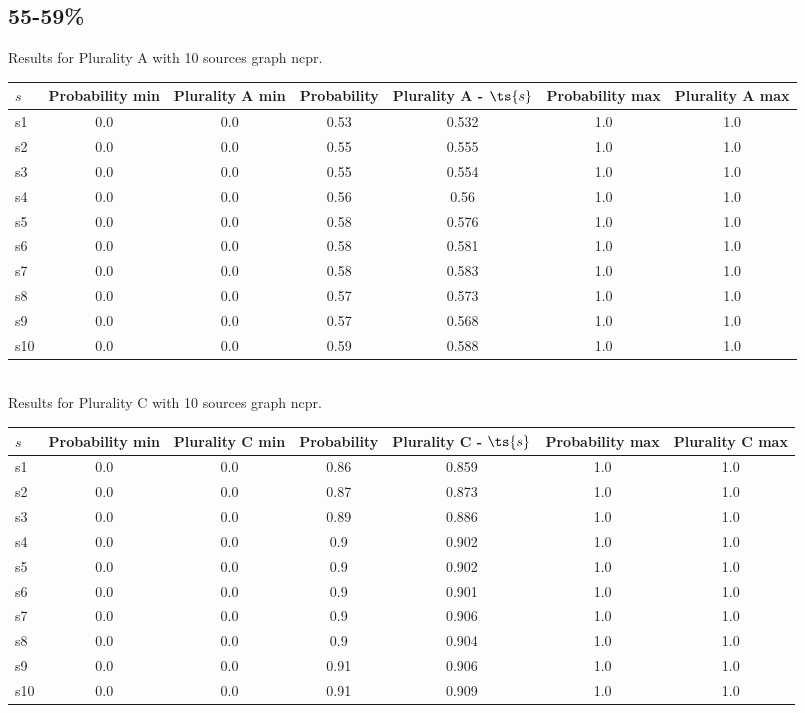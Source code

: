 \documentclass{article}
\begin{document}
\newpage

\subsection{55-59\%}

\noindent Results for Plurality A with 10 sources graph ncpr.

\noindent\begin{tabular}{|l|c|c|c|c|c|c|}
\hline
$s$& Probability min & Plurality A min & Probability & Plurality A - $\ts{s}$ & Probability max & Plurality A max\\
\hline
s1 &0.0 & 0.0 & 0.53 & 0.532 & 1.0 & 1.0\\
\hline
s2 &0.0 & 0.0 & 0.55 & 0.555 & 1.0 & 1.0\\
\hline
s3 &0.0 & 0.0 & 0.55 & 0.554 & 1.0 & 1.0\\
\hline
s4 &0.0 & 0.0 & 0.56 & 0.56 & 1.0 & 1.0\\
\hline
s5 &0.0 & 0.0 & 0.58 & 0.576 & 1.0 & 1.0\\
\hline
s6 &0.0 & 0.0 & 0.58 & 0.581 & 1.0 & 1.0\\
\hline
s7 &0.0 & 0.0 & 0.58 & 0.583 & 1.0 & 1.0\\
\hline
s8 &0.0 & 0.0 & 0.57 & 0.573 & 1.0 & 1.0\\
\hline
s9 &0.0 & 0.0 & 0.57 & 0.568 & 1.0 & 1.0\\
\hline
s10 &0.0 & 0.0 & 0.59 & 0.588 & 1.0 & 1.0\\
\hline
\end{tabular}\\

\noindent Results for Plurality C with 10 sources graph ncpr.

\noindent\begin{tabular}{|l|c|c|c|c|c|c|}
\hline
$s$& Probability min & Plurality C min & Probability & Plurality C - $\ts{s}$ & Probability max & Plurality C max\\
\hline
s1 &0.0 & 0.0 & 0.86 & 0.859 & 1.0 & 1.0\\
\hline
s2 &0.0 & 0.0 & 0.87 & 0.873 & 1.0 & 1.0\\
\hline
s3 &0.0 & 0.0 & 0.89 & 0.886 & 1.0 & 1.0\\
\hline
s4 &0.0 & 0.0 & 0.9 & 0.902 & 1.0 & 1.0\\
\hline
s5 &0.0 & 0.0 & 0.9 & 0.902 & 1.0 & 1.0\\
\hline
s6 &0.0 & 0.0 & 0.9 & 0.901 & 1.0 & 1.0\\
\hline
s7 &0.0 & 0.0 & 0.9 & 0.906 & 1.0 & 1.0\\
\hline
s8 &0.0 & 0.0 & 0.9 & 0.904 & 1.0 & 1.0\\
\hline
s9 &0.0 & 0.0 & 0.91 & 0.906 & 1.0 & 1.0\\
\hline
s10 &0.0 & 0.0 & 0.91 & 0.909 & 1.0 & 1.0\\
\hline
\end{tabular}\\
\end{document}
